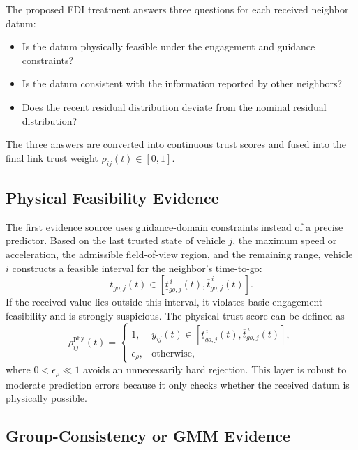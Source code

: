 \documentclass[lettersize,journal]{IEEEtran}
\begin{document}
The proposed FDI treatment answers three questions for each received neighbor datum:
\begin{itemize}
    \item Is the datum physically feasible under the engagement and guidance constraints?
    \item Is the datum consistent with the information reported by other neighbors?
    \item Does the recent residual distribution deviate from the nominal residual distribution?
\end{itemize}
The three answers are converted into continuous trust scores and fused into the final link trust weight $\rho_{ij}(t)\in[0,1]$.

\subsection{Physical Feasibility Evidence}

The first evidence source uses guidance-domain constraints instead of a precise predictor. Based on the last trusted state of vehicle $j$, the maximum speed or acceleration, the admissible field-of-view region, and the remaining range, vehicle $i$ constructs a feasible interval for the neighbor's time-to-go:
\begin{equation}
    t_{go,j}(t)
    \in
    \left[
    \underline t_{go,j}^{\,i}(t),
    \overline t_{go,j}^{\,i}(t)
    \right].
    \label{eq:physical_interval}
\end{equation}
If the received value lies outside this interval, it violates basic engagement feasibility and is strongly suspicious. The physical trust score can be defined as
\begin{equation}
    \rho_{ij}^{\mathrm{phy}}(t)=
    \begin{cases}
        1, &
        y_{ij}(t)\in
        \left[
        \underline t_{go,j}^{\,i}(t),
        \overline t_{go,j}^{\,i}(t)
        \right],\\
        \epsilon_{\rho}, & \text{otherwise},
    \end{cases}
    \label{eq:physical_trust}
\end{equation}
where $0<\epsilon_{\rho}\ll1$ avoids an unnecessarily hard rejection. This layer is robust to moderate prediction errors because it only checks whether the received datum is physically possible.

\subsection{Group-Consistency or GMM Evidence}
\end{document}
